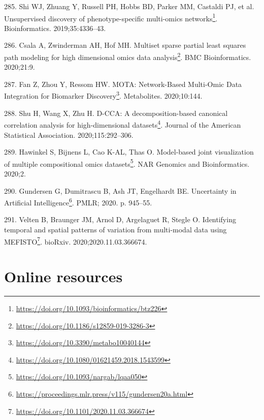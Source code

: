 \documentclass[
  a4paper,
]{book}
\DeclareRobustCommand{\href}[2]{#2\footnote{\url{#1}}}
\newlength{\cslhangindent}
\newlength{\cslentryspacingunit} %
\newenvironment{CSLReferences}[2] %
 {%
  \setlength{\parindent}{0pt}
  \ifodd #1
  \let\oldpar\par
  \def\par{\hangindent=\cslhangindent\oldpar}
  \fi
  \setlength{\parskip}{#2\cslentryspacingunit}
 }%
 {}
\begin{document}
\begin{CSLReferences}{0}{0}
\leavevmode{}%
285. Shi WJ, Zhuang Y, Russell PH, Hobbs BD, Parker MM, Castaldi PJ, et al. \href{https://doi.org/10.1093/bioinformatics/btz226}{Unsupervised discovery of phenotype-specific multi-omics networks}. Bioinformatics. 2019;35:4336--43.

\leavevmode{}%
286. Csala A, Zwinderman AH, Hof MH. \href{https://doi.org/10.1186/s12859-019-3286-3}{Multiset sparse partial least squares path modeling for high dimensional omics data analysis}. BMC Bioinformatics. 2020;21:9.

\leavevmode{}%
287. Fan Z, Zhou Y, Ressom HW. \href{https://doi.org/10.3390/metabo10040144}{MOTA: Network-Based Multi-Omic Data Integration for Biomarker Discovery}. Metabolites. 2020;10:144.

\leavevmode{}%
288. Shu H, Wang X, Zhu H. \href{https://doi.org/10.1080/01621459.2018.1543599}{D-CCA: A decomposition-based canonical correlation analysis for high-dimensional datasets}. Journal of the American Statistical Association. 2020;115:292--306.

\leavevmode{}%
289. Hawinkel S, Bijnens L, Cao K-AL, Thas O. \href{https://doi.org/10.1093/nargab/lqaa050}{Model-based joint visualization of multiple compositional omics datasets}. NAR Genomics and Bioinformatics. 2020;2.

\leavevmode{}%
290. Gundersen G, Dumitrascu B, Ash JT, Engelhardt BE. \href{https://proceedings.mlr.press/v115/gundersen20a.html}{Uncertainty in Artificial Intelligence}. PMLR; 2020. p. 945--55.

\leavevmode{}%
291. Velten B, Braunger JM, Arnol D, Argelaguet R, Stegle O. \href{https://doi.org/10.1101/2020.11.03.366674}{Identifying temporal and spatial patterns of variation from multi-modal data using MEFISTO}. bioRxiv. 2020;2020.11.03.366674.

\end{CSLReferences}

\hypertarget{appendix-appendix}{%
\appendix {}}


\hypertarget{online-resources}{%
\chapter{Online resources}\label{online-resources}}
\end{document}
